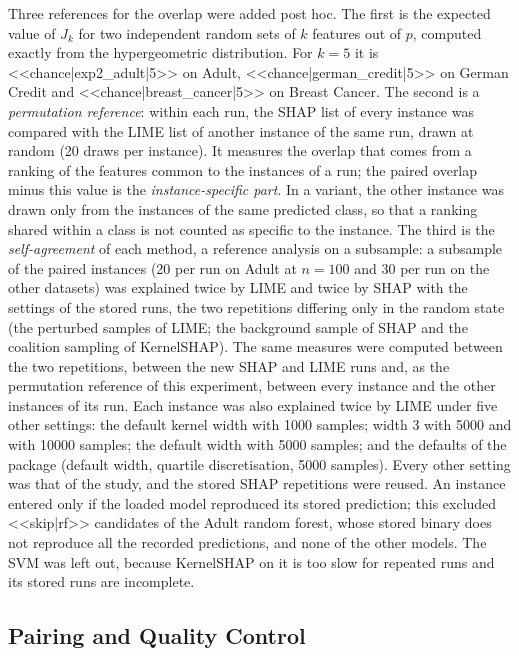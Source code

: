 Three references for the overlap were added post hoc. The first is the expected
value of $J_k$ for two independent random sets of $k$ features out of $p$, computed exactly
from the hypergeometric distribution. For $k = 5$ it is <<chance|exp2_adult|5>> on Adult,
<<chance|german_credit|5>> on German Credit and <<chance|breast_cancer|5>> on Breast
Cancer. The second is a \emph{permutation reference}: within each run, the SHAP list of
every instance was compared with the LIME list of another instance of the same run, drawn
at random (20 draws per instance). It measures the overlap that comes from a ranking of
the features common to the instances of a run; the paired overlap minus this value is the
\emph{instance-specific part}. In a variant, the other instance was drawn only from the
instances of the same predicted class, so that a ranking shared within a class is not
counted as specific to the instance. The third is the \emph{self-agreement} of each method,
a reference analysis on a subsample: a subsample of
the paired instances (20 per run on Adult at $n = 100$ and 30 per run on the other datasets) was explained twice by LIME and twice by SHAP with the settings of
the stored runs, the two repetitions differing only in the random state (the perturbed
samples of LIME; the background sample of SHAP and the coalition sampling of KernelSHAP).
The same measures were computed between the two repetitions, between the new SHAP and
LIME runs and, as the permutation reference of this experiment, between every instance and
the other instances of its run. Each instance was also explained twice by LIME under five
other settings: the default kernel width with 1000 samples; width 3 with 5000 and with
10000 samples; the default width with 5000 samples; and the defaults of the package
(default width, quartile discretisation, 5000 samples). Every other setting was that of the
study, and the stored SHAP repetitions were reused. An instance entered only if the loaded
model reproduced its stored prediction; this excluded <<skip|rf>> candidates of the Adult
random forest, whose stored binary does not reproduce all the recorded predictions, and
none of the other models. The SVM was left out, because KernelSHAP on it is too slow for repeated runs and its stored runs are incomplete.

\subsection{Pairing and Quality Control}

